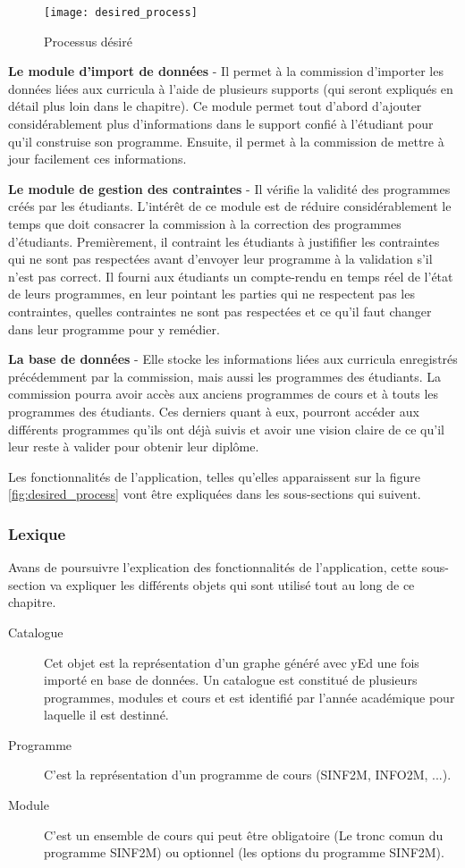 \begin{figure}
\centering
\caption{Processus désiré}
\label{fig:desired_process_2}
\texttt{[image: desired\_process]}
\end{figure}

\textbf{Le module d'import de données} - Il permet à la commission d'importer les données liées aux curricula  à l'aide de plusieurs supports (qui seront expliqués en détail plus loin dans le chapitre). Ce module permet tout d'abord d'ajouter considérablement plus d'informations dans le support confié à l'étudiant pour qu'il construise son programme. Ensuite, il permet à la commission de mettre à jour facilement ces informations. 
 
\textbf{Le module de gestion des contraintes} - Il vérifie la validité des programmes créés par les étudiants. L'intérêt de ce module est de réduire considérablement  le temps que doit consacrer la commission à la correction des programmes d'étudiants. Premièrement, il contraint les étudiants à justififier les contraintes qui ne sont pas respectées avant d'envoyer leur programme à la validation s'il n'est pas correct. Il fourni aux étudiants un compte-rendu en temps réel de l'état de leurs programmes, en leur pointant les parties qui ne respectent pas les contraintes, quelles contraintes ne sont pas respectées et ce qu'il faut changer dans leur programme pour y remédier.

\textbf{La base de données} - Elle stocke les informations liées aux curricula enregistrés précédemment par la commission, mais aussi les programmes des étudiants. La commission pourra avoir accès aux anciens programmes de cours et à touts les programmes des étudiants. Ces derniers quant à eux, pourront accéder aux différents programmes qu'ils ont déjà suivis et avoir une vision claire de ce qu'il leur reste à valider pour obtenir leur diplôme.

Les fonctionnalités de l'application, telles qu'elles apparaissent sur la figure \ref{fig:desired_process} vont être expliquées dans les sous-sections qui suivent.

\subsubsection{Lexique}
\label{lexique}
Avans de poursuivre l'explication des fonctionnalités de l'application, cette sous-section va expliquer les différents objets qui sont utilisé tout au long de ce chapitre.
\begin{description}
\item[Catalogue] Cet objet est la représentation d'un graphe généré avec yEd une fois importé en base de données. Un catalogue est constitué de plusieurs programmes, modules et cours et est identifié par l'année académique pour laquelle il est destinné. 
\item[Programme] C'est la représentation d'un programme de cours (SINF2M, INFO2M, ...).
\item[Module] C'est un ensemble de cours qui peut être obligatoire (Le tronc comun du programme SINF2M) ou optionnel (les options du programme SINF2M).
\end{description}
